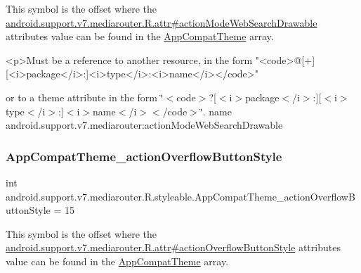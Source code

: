 This symbol is the offset where the \hyperlink{classandroid_1_1support_1_1v7_1_1mediarouter_1_1R_1_1attr_aac26787b1e02ad9a5f11d929916544de}{android.\+support.\+v7.\+mediarouter.\+R.\+attr\#action\+Mode\+Web\+Search\+Drawable} attribute\textquotesingle{}s value can be found in the \hyperlink{classandroid_1_1support_1_1v7_1_1mediarouter_1_1R_1_1styleable_a4e3d3900c75d49aeb2f283cac00214d6}{App\+Compat\+Theme} array.

\begin{DoxyVerb}      <p>Must be a reference to another resource, in the form "<code>@[+][<i>package</i>:]<i>type</i>:<i>name</i></code>"
\end{DoxyVerb}
 or to a theme attribute in the form \char`\"{}$<$code$>$?\mbox{[}$<$i$>$package$<$/i$>$\+:\mbox{]}\mbox{[}$<$i$>$type$<$/i$>$\+:\mbox{]}$<$i$>$name$<$/i$>$$<$/code$>$\char`\"{}.  name android.\+support.\+v7.\+mediarouter\+:action\+Mode\+Web\+Search\+Drawable \mbox{\label{classandroid_1_1support_1_1v7_1_1mediarouter_1_1R_1_1styleable_ac665d51a11a8dd32d6ce85955504ca2a}} 
\subsubsection{\texorpdfstring{App\+Compat\+Theme\+\_\+action\+Overflow\+Button\+Style}{AppCompatTheme\_actionOverflowButtonStyle}}
{\footnotesize\ttfamily int android.\+support.\+v7.\+mediarouter.\+R.\+styleable.\+App\+Compat\+Theme\+\_\+action\+Overflow\+Button\+Style = 15\hspace{0.3cm}{\ttfamily [static]}}

This symbol is the offset where the \hyperlink{classandroid_1_1support_1_1v7_1_1mediarouter_1_1R_1_1attr_ab948c2304affc2087ebc17e217feae9b}{android.\+support.\+v7.\+mediarouter.\+R.\+attr\#action\+Overflow\+Button\+Style} attribute\textquotesingle{}s value can be found in the \hyperlink{classandroid_1_1support_1_1v7_1_1mediarouter_1_1R_1_1styleable_a4e3d3900c75d49aeb2f283cac00214d6}{App\+Compat\+Theme} array.

